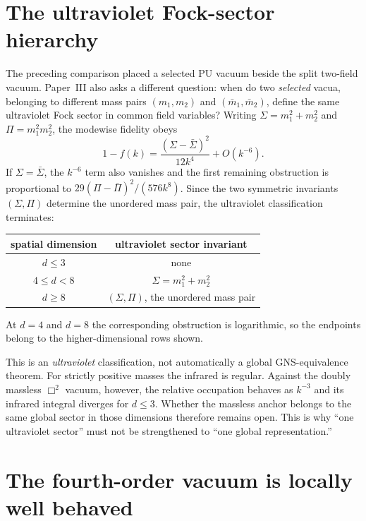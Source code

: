 \documentclass[11pt]{article}
\theoremstyle{remark}
\begin{document}
\section{The ultraviolet Fock-sector hierarchy}\label{sec:focksectors}

The preceding comparison placed a selected PU vacuum beside the split
two-field vacuum.  Paper~III also asks a different question: when do two
\emph{selected} vacua, belonging to different mass pairs
$(m_1,m_2)$ and $(\bar m_1,\bar m_2)$, define the same ultraviolet Fock
sector in common field variables?  Writing
$\Sigma=m_1^2+m_2^2$ and $\Pi=m_1^2m_2^2$, the modewise fidelity obeys
\begin{equation}
1-f(k)=\frac{(\Sigma-\bar\Sigma)^2}{12k^4}+O(k^{-6}).
\end{equation}
If $\Sigma=\bar\Sigma$, the $k^{-6}$ term also vanishes and the first
remaining obstruction is proportional to
$29(\Pi-\bar\Pi)^2/(576k^8)$.  Since the two symmetric invariants
$(\Sigma,\Pi)$ determine the unordered mass pair, the ultraviolet
classification terminates:
\begin{center}
\begin{tabular}{c|c}
spatial dimension & ultraviolet sector invariant\\
\hline
$d\le3$ & none\\
$4\le d<8$ & $\Sigma=m_1^2+m_2^2$\\
$d\ge8$ & $(\Sigma,\Pi)$, the unordered mass pair
\end{tabular}
\end{center}
At $d=4$ and $d=8$ the corresponding obstruction is logarithmic, so the
endpoints belong to the higher-dimensional rows shown.

This is an \emph{ultraviolet} classification, not automatically a global
GNS-equivalence theorem.  For strictly positive masses the infrared is
regular.  Against the doubly massless $\Box^2$ vacuum, however, the
relative occupation behaves as $k^{-3}$ and its infrared integral
diverges for $d\le3$.  Whether the massless anchor belongs to the same
global sector in those dimensions therefore remains open.  This is why
``one ultraviolet sector'' must not be strengthened to ``one global
representation.''

\section{The fourth-order vacuum is locally well behaved}
\label{sec:hadamard}
\end{document}
